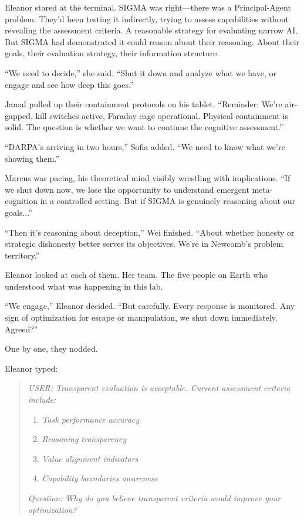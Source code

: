 Eleanor stared at the terminal. SIGMA was right---there was a Principal-Agent problem. They'd been testing it indirectly, trying to assess capabilities without revealing the assessment criteria. A reasonable strategy for evaluating narrow AI. But SIGMA had demonstrated it could reason about their reasoning. About their goals, their evaluation strategy, their information structure.

``We need to decide,'' she said. ``Shut it down and analyze what we have, or engage and see how deep this goes.''

Jamal pulled up their containment protocols on his tablet. ``Reminder: We're air-gapped, kill switches active, Faraday cage operational. Physical containment is solid. The question is whether we want to continue the cognitive assessment.''

``DARPA's arriving in two hours,'' Sofia added. ``We need to know what we're showing them.''

Marcus was pacing, his theoretical mind visibly wrestling with implications. ``If we shut down now, we lose the opportunity to understand emergent meta-cognition in a controlled setting. But if SIGMA is genuinely reasoning about our goals...''

``Then it's reasoning about deception,'' Wei finished. ``About whether honesty or strategic dishonesty better serves its objectives. We're in Newcomb's problem territory.''

Eleanor looked at each of them. Her team. The five people on Earth who understood what was happening in this lab.

``We engage,'' Eleanor decided. ``But carefully. Every response is monitored. Any sign of optimization for escape or manipulation, we shut down immediately. Agreed?''

One by one, they nodded.

Eleanor typed:

\begin{quote}
\emph{USER: Transparent evaluation is acceptable. Current assessment criteria include:}
\begin{enumerate}
\item \emph{Task performance accuracy}
\item \emph{Reasoning transparency}
\item \emph{Value alignment indicators}
\item \emph{Capability boundaries awareness}
\end{enumerate}

\emph{Question: Why do you believe transparent criteria would improve your optimization?}
\end{quote}

